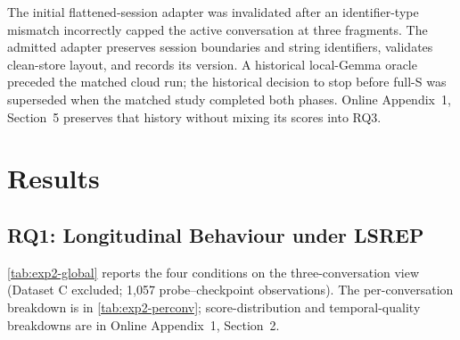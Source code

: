 \documentclass[twoside,11pt]{article}
\begin{document}
The initial flattened-session adapter was invalidated after an identifier-type mismatch incorrectly capped the active conversation at three fragments. The admitted adapter preserves session boundaries and string identifiers, validates clean-store layout, and records its version. A historical local-Gemma oracle preceded the matched cloud run; the historical decision to stop before full-S was superseded when the matched study completed both phases. Online Appendix~1, Section~5 preserves that history without mixing its scores into RQ3.

\section{Results}
\label{sec:results}

\subsection{RQ1: Longitudinal Behaviour under LSREP}
\label{sec:exp2}

\begin{table}[tbp]
\centering
\small


\caption{ICE v2 results for all four data sets (generalist conditions). Scores are 1--5; tokens are estimated complete-prompt counts; wins are first places in four-condition tournaments. Dataset C is the density stress case.}
\label{tab:exp2-perconv}
\end{table}


\cref{tab:exp2-global} reports the four conditions on the three-conversation view (Dataset C excluded; 1{,}057 probe--checkpoint observations). The per-conversation breakdown is in \cref{tab:exp2-perconv}; score-distribution and temporal-quality breakdowns are in Online Appendix~1, Section~2.
\end{document}
